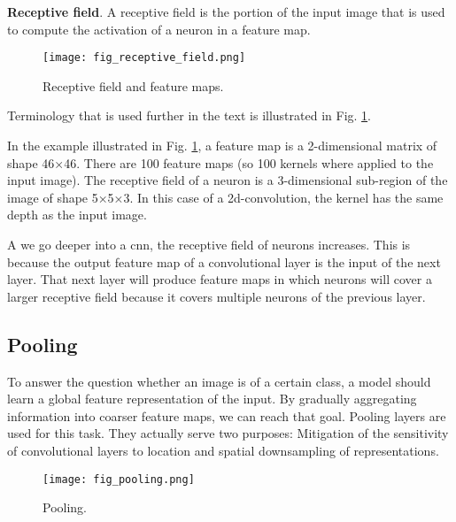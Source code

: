 \textbf{Receptive field}. A receptive field is the portion of the input image that is used to compute the activation of a neuron in a feature map.

\begin{figure}[ht]
    \begin{center}       
    \texttt{[image: fig\_receptive\_field.png]}
    \caption{Receptive field and feature maps.}
    \label{fig:receptive_field}
    \end{center}
\end{figure}
Terminology that is used further in the text is illustrated in Fig. \ref{fig:receptive_field}. 

In the example illustrated in Fig. \ref{fig:receptive_field}, a feature map is a 2-dimensional matrix of shape 46×46. There are 100 feature maps (so 100 kernels where applied to the input image). The receptive field of a neuron is a 3-dimensional sub-region of the image of shape 5×5×3. In this case of a 2d-convolution, the kernel has the same depth as the input image.

A we go deeper into a \acrshort{cnn}, the receptive field of neurons increases. This is because the output feature map of a convolutional layer is the input of the next layer. That next layer will produce feature maps in which neurons will cover a larger receptive field because it covers multiple neurons of the previous layer.

\subsection{Pooling}
To answer the question whether an image is of a certain class, a model should learn a global feature representation of the input. By gradually aggregating information into coarser feature maps, we can reach that goal. Pooling layers are used for this task. They actually serve two purposes: Mitigation of the sensitivity of convolutional layers to location and spatial downsampling of representations.

\begin{figure}[ht]
    \begin{center}       
    \texttt{[image: fig\_pooling.png]}
    \caption{Pooling.}
    \label{fig:pooling}
    \end{center}
\end{figure}

